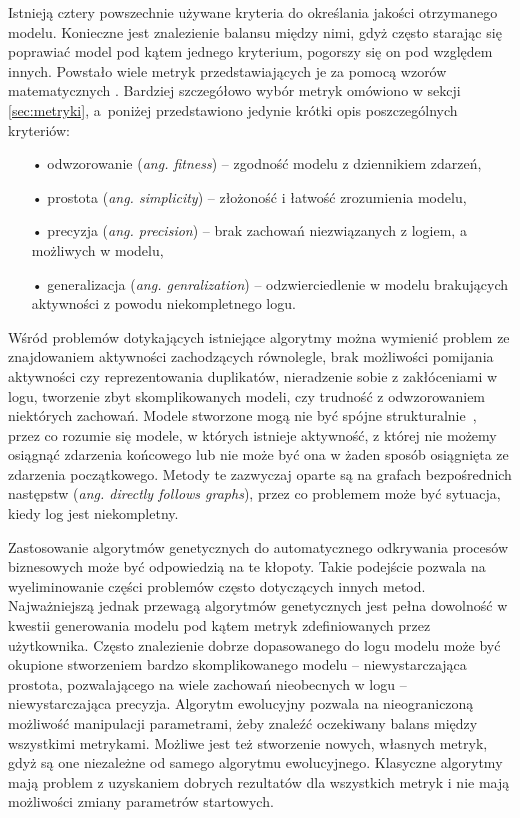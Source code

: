Istnieją cztery powszechnie używane kryteria do określania jakości otrzymanego modelu. Konieczne jest znalezienie balansu między nimi, gdyż często starając się poprawiać model pod kątem jednego kryterium, pogorszy się on pod względem innych. Powstało wiele metryk przedstawiających je za pomocą wzorów matematycznych \cite{conf-propositions, Blum2015MetricsIP}. Bardziej szczegółowo wybór metryk omówiono w sekcji \ref{sec:metryki}, a~poniżej przedstawiono jedynie krótki opis poszczególnych kryteriów:
\begin{itemize}
  \item[•] odwzorowanie (\textit{ang. fitness}) -- zgodność modelu z dziennikiem zdarzeń,
  \item[•] prostota (\textit{ang. simplicity}) -- złożoność i łatwość zrozumienia modelu,
  \item[•] precyzja (\textit{ang. precision}) -- brak zachowań niezwiązanych z logiem, a możliwych w modelu,
  \item[•] generalizacja (\textit{ang. genralization}) -- odzwierciedlenie w modelu brakujących aktywności z powodu niekompletnego logu.
\end{itemize}


Wśród problemów dotykających istniejące algorytmy można wymienić problem ze znajdowaniem aktywności zachodzących równolegle, brak możliwości pomijania aktywności czy reprezentowania duplikatów, nieradzenie sobie z zakłóceniami w logu, tworzenie zbyt skomplikowanych modeli, czy trudność z odwzorowaniem niektórych zachowań. Modele stworzone mogą nie być spójne strukturalnie~\mbox{\cite{dongen2006b, StructuralDetectionofDeadlocks}}, przez co rozumie się modele, w których istnieje aktywność, z której nie możemy osiągnąć zdarzenia końcowego lub nie może być ona w żaden sposób osiągnięta ze zdarzenia początkowego. Metody te zazwyczaj oparte są na grafach bezpośrednich następstw (\textit{ang. directly follows graphs}), przez co problemem może być sytuacja, kiedy log jest niekompletny. 

Zastosowanie algorytmów genetycznych do automatycznego odkrywania procesów biznesowych może być odpowiedzią na te kłopoty. Takie podejście pozwala na wyeliminowanie części problemów często dotyczących innych metod. Najważniejszą jednak przewagą algorytmów genetycznych jest pełna dowolność w kwestii generowania modelu pod kątem metryk zdefiniowanych przez użytkownika. Często znalezienie dobrze dopasowanego do logu modelu może być okupione stworzeniem bardzo skomplikowanego modelu -- niewystarczająca prostota, pozwalającego na wiele zachowań nieobecnych w logu -- niewystarczająca precyzja. Algorytm ewolucyjny pozwala na nieograniczoną możliwość manipulacji parametrami, żeby znaleźć oczekiwany balans między wszystkimi metrykami. Możliwe jest też stworzenie nowych, własnych metryk, gdyż są one niezależne od samego algorytmu ewolucyjnego. Klasyczne algorytmy mają problem z uzyskaniem dobrych rezultatów dla wszystkich metryk i nie mają możliwości zmiany parametrów startowych.


